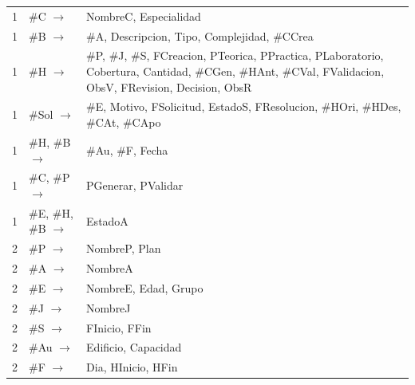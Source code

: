 {\footnotesize\filas
\begin{xltabular}{\linewidth}{c L{0.7}L{1.3}}
 &  &  \\
 & \#C \ensuremath{\to} & NombreC, Especialidad \\
1 & \#B \ensuremath{\to} & \#A, Descripcion, Tipo, Complejidad, \#CCrea \\
1 & \#H \ensuremath{\to} & \#P, \#J, \#S, FCreacion, PTeorica, PPractica, PLaboratorio, Cobertura, Cantidad, \#CGen, \#HAnt, \#CVal, FValidacion, ObsV, FRevision, Decision, ObsR \\
1 & \#Sol \ensuremath{\to} & \#E, Motivo, FSolicitud, EstadoS, FResolucion, \#HOri, \#HDes, \#CAt, \#CApo \\
1 & \#H, \#B \ensuremath{\to} & \#Au, \#F, Fecha \\
1 & \#C, \#P \ensuremath{\to} & PGenerar, PValidar \\
1 & \#E, \#H, \#B \ensuremath{\to} & EstadoA \\
2 & \#P \ensuremath{\to} & NombreP, Plan \\
2 & \#A \ensuremath{\to} & NombreA \\
2 & \#E \ensuremath{\to} & NombreE, Edad, Grupo \\
2 & \#J \ensuremath{\to} & NombreJ \\
2 & \#S \ensuremath{\to} & FInicio, FFin \\
2 & \#Au \ensuremath{\to} & Edificio, Capacidad \\
2 & \#F \ensuremath{\to} & Dia, HInicio, HFin \\
\end{xltabular}}

